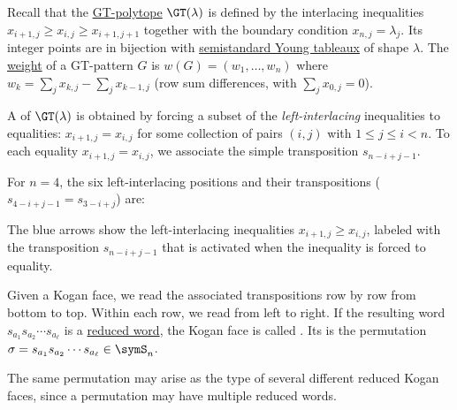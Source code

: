 Recall that the \hyperref[gtpolytopes]{GT-polytope} $\GT(\lambda)$
is defined by the interlacing inequalities
$x_{i+1,j} \geq x_{i,j} \geq x_{i+1,j+1}$
together with the boundary condition $x_{n,j} = \lambda_j$.
Its integer points are in bijection with \hyperref[prelimTableaux]{semistandard Young tableaux} of shape $\lambda$.
The \hyperref[gtpatterns]{weight} of a GT-pattern $G$ is
$w(G) = (w_1, \dotsc, w_n)$ where
$w_k = \sum_j x_{k,j} - \sum_j x_{k-1,j}$
(row sum differences, with $\sum_j x_{0,j} = 0$).

\begin{definition}\label{def:koganFace}\label{koganFace}
A  of $\GT(\lambda)$ is obtained by forcing
a subset of the \emph{left-interlacing} inequalities to equalities:
$x_{i+1,j} = x_{i,j}$
for some collection of pairs $(i,j)$ with $1 \leq j \leq i \lt n$.
To each equality $x_{i+1,j} = x_{i,j}$, we associate the simple transposition
$s_{n-i+j-1}$.
\end{definition}

\begin{example*}
For $n = 4$, the six left-interlacing positions and their transpositions
($s_{4-i+j-1} = s_{3-i+j}$) are:
\begin{figure}
\end{figure}
The blue arrows show the left-interlacing inequalities $x_{i+1,j} \geq x_{i,j}$,
labeled with the transposition $s_{n-i+j-1}$ that is activated when the
inequality is forced to equality.
\end{example*}


\begin{definition}\label{def:reducedKogan}
\label{reducedKoganFace}
Given a Kogan face, we read the associated transpositions row by row from
bottom to top.
Within each row, we read from left to right.
If the resulting word $s_{a_1} s_{a_2} \dotsm s_{a_\ell}$
is a \hyperref[reducedWord]{reduced word}, the Kogan face is called
.
Its \label{koganType} is the permutation
$\sigma = s_{a_1} s_{a_2} \dotsm s_{a_\ell} \in \symS_n$.
\end{definition}

\begin{remark}
The same permutation may arise as the type of several
different reduced Kogan faces, since a permutation may have multiple reduced words.
\end{remark}


